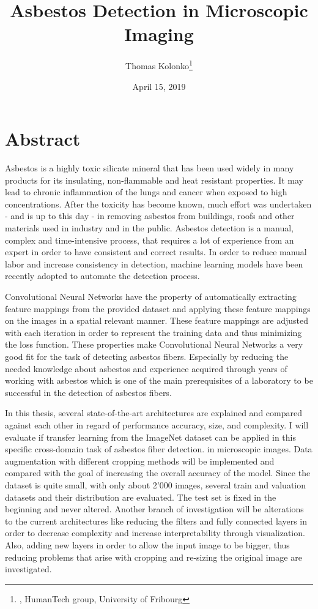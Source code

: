 \documentclass[11pt,a4paper,twoside,hidelinks,openright]{rvsmaster}
\author{Thomas Kolonko\thanks{\email{thomas.kolonko@students.unibe.ch}, HumanTech group, University of Fribourg}}
\title{Asbestos Detection in Microscopic Imaging}
\date{April 15, 2019} %
\begin{document}
\maketitle
\thispagestyle{empty}
\mbox{}

\newpage

\chapter*{Abstract}

Asbestos is a highly toxic silicate mineral that has been used widely in many products for its insulating, non-flammable and heat resistant properties. It may lead to chronic inflammation of the lungs and cancer when exposed to high concentrations. After the toxicity has become known, much effort was undertaken - and is up to this day - in removing asbestos from buildings, roofs and other materials used in industry and in the public. Asbestos detection is a manual, complex and time-intensive process, that requires a lot of experience from an expert in order to have consistent and correct results. In order to reduce manual labor and increase consistency in detection, machine learning models have been recently adopted to automate the detection process.

\vspace{5mm} %

Convolutional Neural Networks have the property of automatically extracting feature mappings from the provided dataset and applying these feature mappings on the images in a spatial relevant manner. These feature mappings are adjusted with each iteration in order to represent the training data and thus minimizing the loss function. These properties make Convolutional Neural Networks a very good fit for the task of detecting asbestos fibers. Especially by reducing the needed knowledge about asbestos and experience acquired through years of working with asbestos which is one of the main prerequisites of a laboratory to be successful in the detection of asbestos fibers.

\vspace{5mm} %

In this thesis, several state-of-the-art architectures are explained and compared against each other in regard of performance accuracy, size, and complexity. I will evaluate if transfer learning from the ImageNet dataset can be applied in this specific cross-domain task of asbestos fiber detection. in microscopic images. Data augmentation with different cropping methods will be implemented and compared with the goal of increasing the overall accuracy of the model. Since the dataset is quite small, with only about 2'000 images, several train and valuation datasets and their distribution are evaluated. The test set is fixed in the beginning and never altered. Another branch of investigation will be alterations to the current architectures like reducing the filters and fully connected layers in order to decrease complexity and increase interpretability through visualization. Also, adding new layers in order to allow the input image to be bigger, thus reducing problems that arise with cropping and re-sizing the original image are investigated.
\end{document}
